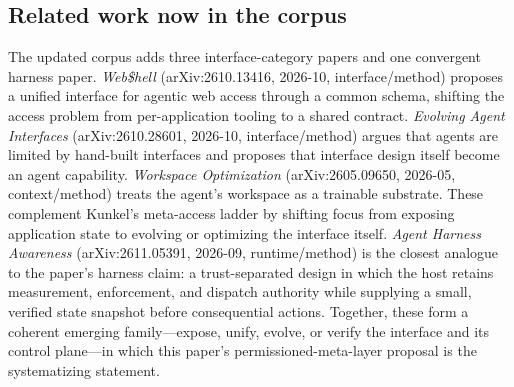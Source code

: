 \documentclass[11pt,a4paper]{article}
\begin{document}
\subsection{Related work now in the corpus}
The updated corpus adds three interface-category papers and one convergent harness paper. \emph{Web\$hell} (arXiv:2610.13416, 2026-10, interface/method) proposes a unified interface for agentic web access through a common schema, shifting the access problem from per-application tooling to a shared contract. \emph{Evolving Agent Interfaces} (arXiv:2610.28601, 2026-10, interface/method) argues that agents are limited by hand-built interfaces and proposes that interface design itself become an agent capability. \emph{Workspace Optimization} (arXiv:2605.09650, 2026-05, context/method) treats the agent's workspace as a trainable substrate. These complement Kunkel's meta-access ladder by shifting focus from exposing application state to evolving or optimizing the interface itself. \emph{Agent Harness Awareness} (arXiv:2611.05391, 2026-09, runtime/method) is the closest analogue to the paper's harness claim: a trust-separated design in which the host retains measurement, enforcement, and dispatch authority while supplying a small, verified state snapshot before consequential actions. Together, these form a coherent emerging family---expose, unify, evolve, or verify the interface and its control plane---in which this paper's permissioned-meta-layer proposal is the systematizing statement.
\end{document}

